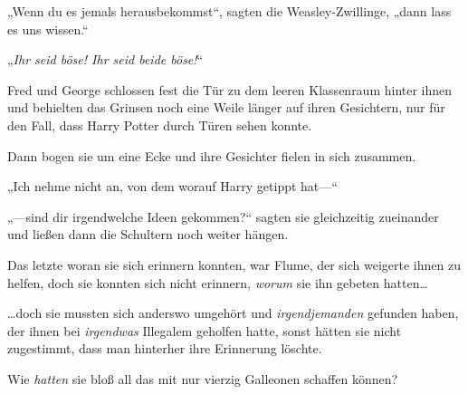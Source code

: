 „Wenn du es jemals herausbekommst“, sagten die Weasley-Zwillinge, „dann lass es uns wissen.“

„\emph{Ihr seid böse! Ihr seid beide böse!}“

Fred und George schlossen fest die Tür zu dem leeren Klassenraum hinter ihnen und behielten das Grinsen noch eine Weile länger auf ihren Gesichtern, nur für den Fall, dass Harry Potter durch Türen sehen konnte.

Dann bogen sie um eine Ecke und ihre Gesichter fielen in sich zusammen.

„Ich nehme nicht an, von dem worauf Harry getippt hat—“

„—sind dir irgendwelche Ideen gekommen?“ sagten sie gleichzeitig zueinander und ließen dann die Schultern noch weiter hängen.

Das letzte woran sie sich erinnern konnten, war Flume, der sich weigerte ihnen zu helfen, doch sie konnten sich nicht erinnern, \emph{worum} sie ihn gebeten hatten…

…doch sie mussten sich anderswo umgehört und \emph{irgendjemanden} gefunden haben, der ihnen bei \emph{irgendwas} Illegalem geholfen hatte, sonst hätten sie nicht zugestimmt, dass man hinterher ihre Erinnerung löschte.

Wie \emph{hatten} sie bloß all das mit nur vierzig Galleonen schaffen können?

